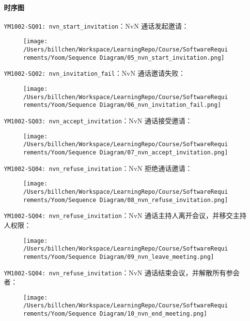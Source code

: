 \documentclass[]{ctexart}
\let\oldparagraph\paragraph
\renewcommand{\paragraph}[1]{\oldparagraph{#1}\mbox{}}
\begin{document}
\hypertarget{ux65f6ux5e8fux56fe-2}{%
\paragraph{时序图}\label{ux65f6ux5e8fux56fe-2}}

\texttt{YM1002-SQ01:\ nvn\_start\_invitation}：NvN 通话发起邀请：

\begin{figure}
\centering
\texttt{[image: /Users/billchen/Workspace/LearningRepo/Course/SoftwareRequirements/Yoom/Sequence Diagram/05\_nvn\_start\_invitation.png]}
\caption{}
\end{figure}

\texttt{YM1002-SQ02:\ nvn\_invitation\_fail}：NvN 通话邀请失败：

\begin{figure}
\centering
\texttt{[image: /Users/billchen/Workspace/LearningRepo/Course/SoftwareRequirements/Yoom/Sequence Diagram/06\_nvn\_invitation\_fail.png]}
\caption{}
\end{figure}

\texttt{YM1002-SQ03:\ nvn\_accept\_invitation}：NvN 通话接受邀请：

\begin{figure}
\centering
\texttt{[image: /Users/billchen/Workspace/LearningRepo/Course/SoftwareRequirements/Yoom/Sequence Diagram/07\_nvn\_accept\_invitation.png]}
\caption{}
\end{figure}

\texttt{YM1002-SQ04:\ nvn\_refuse\_invitation}：NvN 拒绝通话邀请：

\begin{figure}
\centering
\texttt{[image: /Users/billchen/Workspace/LearningRepo/Course/SoftwareRequirements/Yoom/Sequence Diagram/08\_nvn\_refuse\_invitation.png]}
\caption{}
\end{figure}

\texttt{YM1002-SQ04:\ nvn\_refuse\_invitation}：NvN
通话主持人离开会议，并移交主持人权限：

\begin{figure}
\centering
\texttt{[image: /Users/billchen/Workspace/LearningRepo/Course/SoftwareRequirements/Yoom/Sequence Diagram/09\_nvn\_leave\_meeting.png]}
\caption{}
\end{figure}

\texttt{YM1002-SQ04:\ nvn\_refuse\_invitation}：NvN
通话结束会议，并解散所有参会者：

\begin{figure}
\centering
\texttt{[image: /Users/billchen/Workspace/LearningRepo/Course/SoftwareRequirements/Yoom/Sequence Diagram/10\_nvn\_end\_meeting.png]}
\caption{}
\end{figure}
\end{document}
